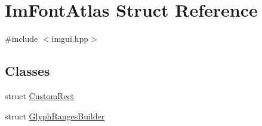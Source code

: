 \hypertarget{struct_im_font_atlas}{}\section{Im\+Font\+Atlas Struct Reference}
\label{struct_im_font_atlas}


{\ttfamily \#include $<$imgui.\+hpp$>$}

\subsection*{Classes}
\begin{DoxyCompactItemize}
\item 
struct \hyperlink{struct_im_font_atlas_1_1_custom_rect}{Custom\+Rect}
\item 
struct \hyperlink{struct_im_font_atlas_1_1_glyph_ranges_builder}{Glyph\+Ranges\+Builder}
\end{DoxyCompactItemize}
